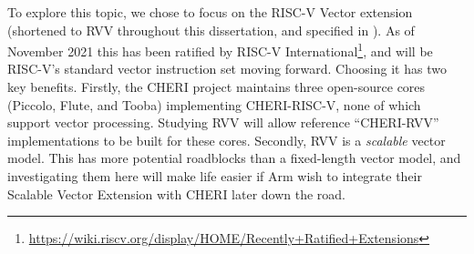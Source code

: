 To explore this topic, we chose to focus on the RISC-V Vector extension (shortened to RVV throughout this dissertation, and specified in \cite{specification-RVV-v1.0}).
As of November 2021 this has been ratified by RISC-V International\footnote{\url{https://wiki.riscv.org/display/HOME/Recently+Ratified+Extensions}}, and will be RISC-V's standard vector instruction set moving forward.
Choosing it has two key benefits.
Firstly, the CHERI project maintains three open-source cores (Piccolo, Flute, and Tooba) implementing CHERI-RISC-V, none of which support vector processing.
Studying RVV will allow reference \enquote{CHERI-RVV} implementations to be built for these cores.
Secondly, RVV is a \emph{scalable} vector model.
This has more potential roadblocks than a fixed-length vector model, and investigating them here will make life easier if Arm wish to integrate their Scalable Vector Extension with CHERI later down the road.




